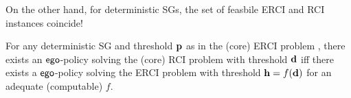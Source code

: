 

On the other hand, for deterministic SGs, the set of feasbile ERCI and
RCI instances coincide!
\begin{theorem}
  For any deterministic SG 
  and threshold $\mathbf{p}$ as in the (core) ERCI problem , there exists an $\mathsf{ego}$-policy solving
  the (core) RCI problem with threshold $\mathbf{d}$ iff there exists a
  $\mathsf{ego}$-policy solving the ERCI problem with threshold
  $\mathbf{h} = f(\mathbf{d})$ for an adequate (computable) $f$.
\end{theorem}
